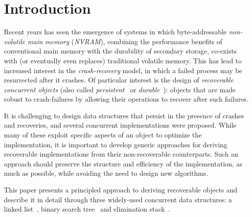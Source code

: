 \section{Introduction}

Recent years has seen the emergence of systems in which
byte-addressable \emph{non-volatile main memory} (\emph{NVRAM}),
combining the performance benefits of conventional main memory
with the durability of secondary storage,
co-exists with (or eventually even replaces) traditional volatile memory.
This has lead to increased interest in the \emph{crash-recovery} model,
in which a failed process may be resurrected after it crashes.
Of particular interest is the design of \emph{recoverable concurrent
objects} (also called
\emph{persistent}~\cite{CoburnCAGGJW-Asplos2011,ChenQ-VLDB2015}
or \emph{durable}~\cite{VenkataramanTRC-FAST2011}):
objects that are made robust to crash-failures by allowing their operations
to recover after such failures.

It is challenging to design data structures that persist in the presence of
crashes and recoveries, and several concurrent implementations were proposed. %
While many of these exploit specific aspects of an object to
optimize the implementation, it is important to develop generic
approaches for deriving recoverable implementations from their
non-recoverable counterparts.
Such an approach should preserve the structure and efficiency of
the implementation, as much as possible,
while avoiding the need to design new algorithms.

This paper presents a principled approach to deriving recoverable
objects and describe it in detail through three widely-used
concurrent data structures:
a linked list~\cite{DBLP:conf/wdag/Harris01},
binary search tree~\cite{}
and elimination stack~\cite{DBLP:journals/jpdc/HendlerSY10}.

